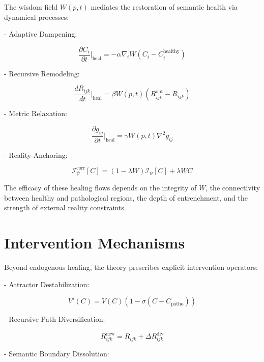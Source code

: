 The wisdom field $W(p,t)$ mediates the restoration of semantic health via dynamical processes:

- Adaptive Dampening:

\begin{equation}
\frac{\partial C_i}{\partial t}\bigg|_{\text{heal}} = -\alpha \nabla_i W (C_i - C_i^{\text{healthy}})
\end{equation}

- Recursive Remodeling:

\begin{equation}
\frac{dR_{ijk}}{dt}\bigg|_{\text{heal}} = \beta W(p,t) (R_{ijk}^{\text{opt}} - R_{ijk})
\end{equation}

- Metric Relaxation:

\begin{equation}
\frac{\partial g_{ij}}{\partial t}\bigg|_{\text{heal}} = \gamma W(p,t) \nabla^2 g_{ij}
\end{equation}

- Reality-Anchoring:

\begin{equation}
\mathcal{I}_{\psi}^{\text{corr}}[C] = (1-\lambda W)\mathcal{I}_{\psi}[C] + \lambda W C
\end{equation}

The efficacy of these healing flows depends on the integrity of $W$, the connectivity between healthy and pathological regions, the depth of entrenchment, and the strength of external reality constraints.

\section{Intervention Mechanisms}

Beyond endogenous healing, the theory prescribes explicit intervention operators:

- Attractor Destabilization:

\begin{equation}
V'(C) = V(C) (1 - \sigma(C - C_{\text{patho}}))
\end{equation}

- Recursive Path Diversification:

\begin{equation}
R_{ijk}^{\text{new}} = R_{ijk} + \Delta R_{ijk}^{\text{div}}
\end{equation}

- Semantic Boundary Dissolution:

